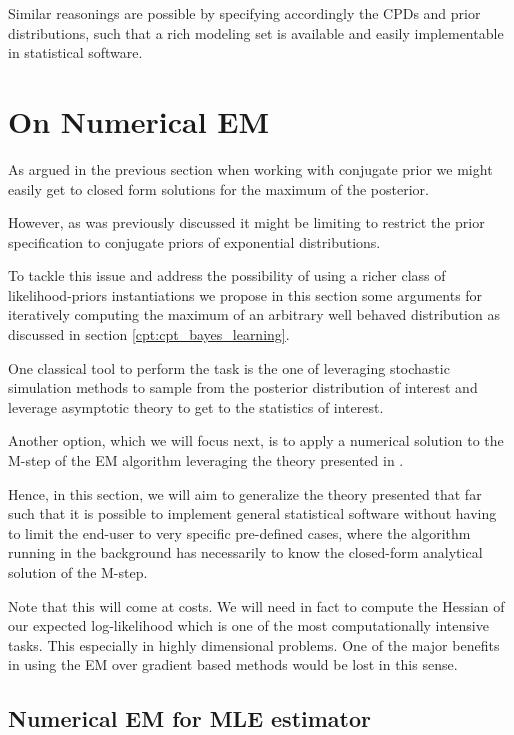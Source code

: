 \documentclass[11pt]{article}
\begin{document}
\begin{article}
Similar reasonings are possible by specifying accordingly the CPDs
and prior distributions, such that a rich modeling set is
available and easily implementable in statistical software.

\newpage

\section{On Numerical EM}
\label{numerical-em}
As argued in the previous section when working with conjugate prior
we might easily get to closed form solutions for the maximum of the
posterior.

However, as was previously discussed it might be limiting to
restrict the prior specification to conjugate priors of exponential
distributions.

To tackle this issue and address the possibility of using a richer
class of likelihood-priors instantiations we propose in this
section some arguments for iteratively computing the maximum of an
arbitrary well behaved distribution as discussed in section
\ref{cpt:cpt_bayes_learning}.

One classical tool to perform the task is the one of leveraging
stochastic simulation methods to sample from the posterior
distribution of interest and leverage asymptotic theory to get to
the statistics of interest.

Another option, which we will focus next, is to apply a numerical
solution to the M-step of the EM algorithm leveraging the theory
presented in \cite{ruud1989comparison}.

Hence, in this section, we will aim to generalize the theory
presented that far such that it is possible to implement general
statistical software without having to limit the end-user to very
specific pre-defined cases, where the algorithm running in the
background has necessarily to know the closed-form analytical
solution of the M-step.

Note that this will come at costs. We will need in fact to compute
the Hessian of our expected log-likelihood which is one of the most
computationally intensive tasks. This especially in highly
dimensional problems. One of the major benefits in using the EM over
gradient based methods would be lost in this sense.

\subsection{Numerical EM for MLE estimator}
\label{sec:org3d4bcc2}


\end{article}
\end{document}
